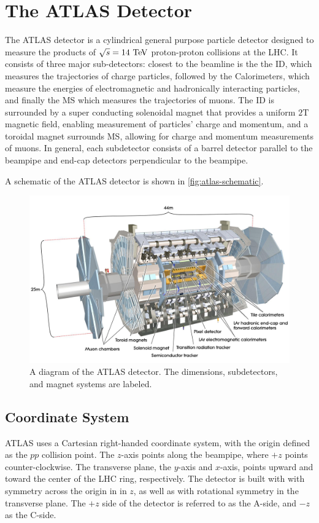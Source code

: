 \chapter{The ATLAS Detector}

The \ac{ATLAS} detector is a cylindrical general purpose particle detector designed to measure the products of $\sqrt{s} = 14 \TeV$ proton-proton collisions at the \ac{LHC}. It consists of three major sub-detectors: closest to the beamline is the the \ac{ID}, which measures the trajectories of charge particles, followed by the Calorimeters, which measure the energies of electromagnetic and hadronically interacting particles, and finally the \ac{MS} which measures the trajectories of muons. The \ac{ID} is surrounded by a super conducting solenoidal magnet that provides a uniform $2\textrm{T}$ magnetic field, enabling measurement of particles' charge and momentum, and a toroidal magnet surrounds \ac{MS}, allowing for charge and momentum measurements of muons. In general, each subdetector consists of a barrel detector parallel to the beampipe and end-cap detectors perpendicular to the beampipe. \cite{atlas-overview}

A schematic of the \ac{ATLAS} detector is shown in \autoref{fig:atlas-schematic}.


\begin{figure}[htbp]
\centering
\includegraphics[width=.8\textwidth]{figures/Detector/atlas-schematic.jpg}
\caption{A diagram of the \ac{ATLAS} detector. The dimensions, subdetectors, and magnet systems are labeled. }
\label{fig:atlas-schematic}
\end{figure}

\section{Coordinate System}
\ac{ATLAS} uses a Cartesian right-handed coordinate system, with the origin defined as the $pp$ collision point. The $z$-axis points along the beampipe, where $+z$ points counter-clockwise. The transverse plane, the $y$-axis and $x$-axis, points upward and toward the center of the \ac{LHC} ring, respectively. The detector is built with with symmetry across the origin in in $z$, as well as with rotational symmetry in the transverse plane. The $+z$ side of the detector is referred to as the A-side, and $-z$ as the C-side.


